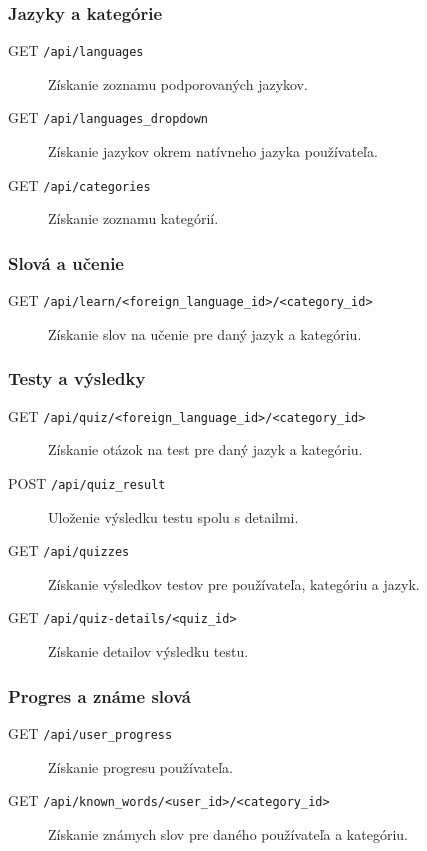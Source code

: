 \documentclass{article}
\begin{document}
\subsubsection{Jazyky a kategórie}
\begin{description}
    \item[GET \texttt{/api/languages}] Získanie zoznamu podporovaných jazykov.
    \item[GET \texttt{/api/languages\_dropdown}] Získanie jazykov okrem natívneho jazyka používateľa.
    \item[GET \texttt{/api/categories}] Získanie zoznamu kategórií.
\end{description}

\subsubsection{Slová a učenie}
\begin{description}
    \item[GET \texttt{/api/learn/\textless{}foreign\_language\_id\textgreater{}/\textless{}category\_id\textgreater{}}] Získanie slov na učenie pre daný jazyk a kategóriu.
\end{description}


\subsubsection{Testy a výsledky}
\begin{description}
    \item[GET \texttt{/api/quiz/\textless{}foreign\_language\_id\textgreater{}/\textless{}category\_id\textgreater{}}] Získanie otázok na test pre daný jazyk a kategóriu.
    \item[POST \texttt{/api/quiz\_result}] Uloženie výsledku testu spolu s detailmi.
    \item[GET \texttt{/api/quizzes}] Získanie výsledkov testov pre používateľa, kategóriu a jazyk.
    \item[GET \texttt{/api/quiz-details/\textless{}quiz\_id\textgreater{}}] Získanie detailov výsledku testu.
\end{description}

\subsubsection*{Progres a známe slová}
\begin{description}
    \item[GET \texttt{/api/user\_progress}] Získanie progresu používateľa.
    \item[GET \texttt{/api/known\_words/\textless{}user\_id\textgreater{}/\textless{}category\_id\textgreater{}}] Získanie známych slov pre daného používateľa a kategóriu.
\end{description}
\end{document}
